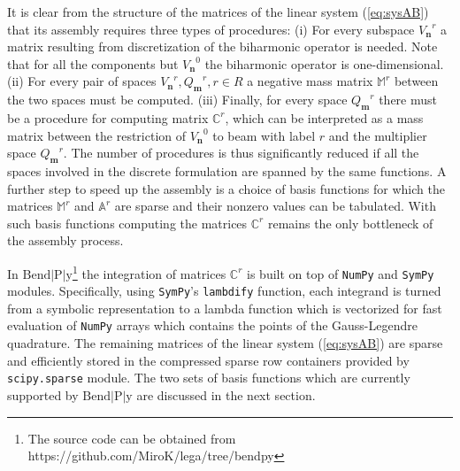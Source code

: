 \documentclass{marine_2015}
\newcommand{\Vh}{\ensuremath{V_{\mathbf{n}}}}
\newcommand{\Qh}{\ensuremath{Q_{\mathbf{m}}}}
\begin{document}
It is clear from the structure of the matrices of the linear system
(\ref{eq:sysAB}) that its assembly requires three types of procedures: (i) For 
every subspace $\Vh^r$ a matrix resulting from discretization of the biharmonic operator is needed.
Note that for all the components but $\Vh^0$ the biharmonic operator is one-dimensional. 
(ii) For every pair of spaces $\Vh^r, \Qh^r, r\in R$ a negative mass
matrix $\mathbb{M}^r$ between the two spaces must be computed. (iii) Finally, for
every space $\Qh^r$ there must be a procedure for computing matrix $\mathbb{C}^r$,
which can be interpreted as a mass matrix between the restriction of $\Vh^0$ to
beam with label $r$ and the multiplier space $\Qh^r$. The number of procedures is 
thus significantly reduced if all the spaces involved in the discrete formulation 
are spanned by the same functions. A further step to speed up the assembly is a 
choice of basis functions for which the matrices $\mathbb{M}^r$ and $\mathbb{A}^r$ 
are sparse and their nonzero values can be tabulated. With such basis functions 
computing the matrices $\mathbb{C}^r$ remains the only bottleneck of the assembly 
process. 

In $\text{Bend}\!\left|\text{P}\right|\!\text{y}$\footnote{The source code
can be obtained from https://github.com/MiroK/lega/tree/bendpy} the integration of matrices $\mathbb{C}^r$ is built on top of
{\tt{NumPy}}\cite{numpy} and {\tt{SymPy}}\cite{sympy} modules. Specifically, using
{\tt{SymPy}}'s {\tt{lambdify}} function, each integrand is turned from a symbolic 
representation to a lambda function which is vectorized for fast evaluation of 
{\tt{NumPy}} arrays which contains the points of the Gauss-Legendre quadrature. 
The remaining matrices of the linear system (\ref{eq:sysAB}) are sparse and 
efficiently stored in the compressed sparse row containers provided by {\tt{scipy.sparse}} module.
The two sets of basis functions which are currently supported by $\text{Bend}\!\left|\text{P}\right|\!\text{y}$
are discussed in the next section.
\end{document}
